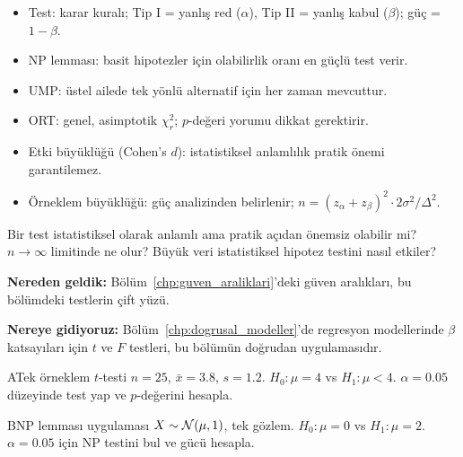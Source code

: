 \begin{mikroozet}
\begin{itemize}
  \item Test: karar kuralı; Tip I = yanlış red ($\alpha$), Tip II = yanlış kabul ($\beta$); güç = $1-\beta$.
  \item NP lemması: basit hipotezler için olabilirlik oranı en güçlü test verir.
  \item UMP: üstel ailede tek yönlü alternatif için her zaman mevcuttur.
  \item ORT: genel, asimptotik $\chi^2_r$; $p$-değeri yorumu dikkat gerektirir.
  \item Etki büyüklüğü (Cohen's $d$): istatistiksel anlamlılık pratik önemi garantilemez.
  \item Örneklem büyüklüğü: güç analizinden belirlenir; $n=(z_\alpha+z_\beta)^2\cdot2\sigma^2/\Delta^2$.
\end{itemize}
\end{mikroozet}

\begin{ozyansima}
Bir test istatistiksel olarak anlamlı ama pratik açıdan önemsiz olabilir mi? $n\to\infty$ limitinde ne olur? Büyük veri istatistiksel hipotez testini nasıl etkiler?
\end{ozyansima}

\begin{kopru}
\textbf{Nereden geldik:} Bölüm~\ref{chp:guven_araliklari}'deki güven aralıkları, bu bölümdeki testlerin çift yüzü.

\textbf{Nereye gidiyoruz:} Bölüm~\ref{chp:dogrusal_modeller}'de regresyon modellerinde $\beta$ katsayıları için $t$ ve $F$ testleri, bu bölümün doğrudan uygulamasıdır.
\end{kopru}


\cozumlualistirmalar

\begin{alistirma}[Al.14.1]{A}{Tek örneklem $t$-testi}
$n=25$, $\bar{x}=3.8$, $s=1.2$. $H_0:\mu=4$ vs $H_1:\mu<4$. $\alpha=0.05$ düzeyinde test yap ve $p$-değerini hesapla.
\end{alistirma}

\begin{alistirma}[Al.14.2]{B}{NP lemması uygulaması}
$X\sim\mathcal{N}(\mu,1)$, tek gözlem. $H_0:\mu=0$ vs $H_1:\mu=2$. $\alpha=0.05$ için NP testini bul ve gücü hesapla.
\end{alistirma}

